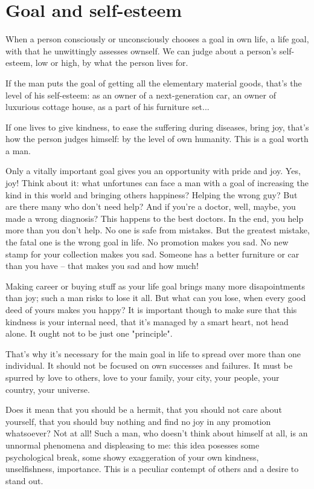 \chapter{Goal and self-esteem}

When a person consciously or unconsciously chooses a goal in own life, a life goal, with that he unwittingly assesses ownself. We can judge about a person's self-esteem, low or high, by what the person lives for.

If the man puts the goal of getting all the elementary material goods, that's the level of his self-esteem: as an owner of a next-generation car, an owner of luxurious cottage house, as a part of his furniture set...

If one lives to give kindness, to ease the suffering during diseases, bring joy, that's how the person judges himself: by the level of own humanity. This is a goal worth a man.

Only a vitally important goal gives you an opportunity with pride and joy. Yes, joy! Think about it: what unfortunes can face a man with a goal of increasing the kind in this world and bringing others happiness?  Helping the wrong guy? But are there many who don't need help? And if you're a doctor, well, maybe, you made a wrong diagnosis? This happens to the best doctors. In the end, you help more than you don't help. No one is safe from mistakes. But the greatest mistake, the fatal one is the wrong goal in life. No promotion makes you sad. No new stamp for your collection makes you sad. Someone has a better furniture or car than you have -- that makes you sad and how much!

Making career or buying stuff as your life goal brings many more disapointments than joy; such a man risks to lose it all. But what can you lose, when every good deed of yours makes you happy? It is important though to make sure that this kindness is your internal need, that it's managed by a smart heart, not head alone. It ought not to be just one "principle".

That's why it's necessary for the main goal in life to spread over more than one individual. It should not be focused on own successes and failures. It must be spurred by love to others, love to your family, your city, your people, your country, your universe.

Does it mean that you should be a hermit, that you should not care about yourself, that you should buy nothing and find no joy in any promotion whatsoever? Not at all! Such a man, who doesn't think about himself at all, is an unnormal phenomena and displeasing to me: this idea posesses some psychological break, some showy exaggeration of your own kindness, unselfishness, importance. This is a peculiar contempt of others and a desire to stand out.

